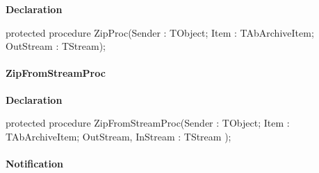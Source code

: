 \documentclass{report}
\newif\ifpdf
\begin{document}
\label{AbZipper.TAbCustomZipper-ZipProc}
\begin{list}{}{
\setlength{\itemindent}{0cm}
\setlength{\listparindent}{0cm}
\setlength{\leftmargin}{\evensidemargin}
\addtolength{\leftmargin}{\tmplength}
\settowidth{\labelsep}{X}
\addtolength{\leftmargin}{\labelsep}
\setlength{\labelwidth}{\tmplength}
}
\item[\textbf{Declaration}\hfill]
\ifpdf
\begin{flushleft}
\fi
\begin{ttfamily}
protected procedure ZipProc(Sender : TObject; Item : TAbArchiveItem; OutStream : TStream);\end{ttfamily}

\ifpdf
\end{flushleft}
\fi

\end{list}
\paragraph*{ZipFromStreamProc}\hspace*{\fill}

\label{AbZipper.TAbCustomZipper-ZipFromStreamProc}
\begin{list}{}{
\setlength{\itemindent}{0cm}
\setlength{\listparindent}{0cm}
\setlength{\leftmargin}{\evensidemargin}
\addtolength{\leftmargin}{\tmplength}
\settowidth{\labelsep}{X}
\addtolength{\leftmargin}{\labelsep}
\setlength{\labelwidth}{\tmplength}
}
\item[\textbf{Declaration}\hfill]
\ifpdf
\begin{flushleft}
\fi
\begin{ttfamily}
protected procedure ZipFromStreamProc(Sender : TObject; Item : TAbArchiveItem; OutStream, InStream : TStream );\end{ttfamily}

\ifpdf
\end{flushleft}
\fi

\end{list}
\paragraph*{Notification}\hspace*{\fill}
\end{document}
